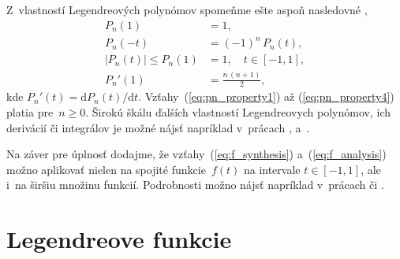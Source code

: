 \documentclass[a4paper,12pt]{book}
\newcommand{\diff}{\mathrm d}
\begin{document}
Z~vlastností Legendreových polynómov spomeňme ešte aspoň nasledovné
\parencite{Freeden2009},
%
\begin{align}
\label{eq:pn_property1}
P_n(1) &= 1{,}\\
%
\label{eq:pn_property2}
P_n(-t) &= (-1)^n \, P_n(t){,}\\
%
\label{eq:pn_property3}
|P_n(t)| \leq P_n(1) &= 1{,} \quad t \in [-1, 1]{,}\\
%
\label{eq:pn_property4}
P_n'(1) &= \frac{n \, (n + 1)}{2}{,}
\end{align}
%
kde $P_n'(t) = \diff P_n(t) \slash \diff t$.  Vzťahy~(\ref{eq:pn_property1}) až
(\ref{eq:pn_property4}) platia pre~$n \geq 0$.   Širokú škálu ďalších
vlastností Legendreovych polynómov, ich derivácií či integrálov je možné nájsť
napríklad v~prácach \textcite{Gradshteyn2007}, \textcite{Freeden2009}
a~\textcite{Olver2010}.

Na záver pre úplnosť dodajme, že vzťahy~(\ref{eq:f_synthesis})
a~(\ref{eq:f_analysis}) možno aplikovať nielen na spojité funkcie~$f(t)$ na
intervale $t \in [-1, 1]$, ale i~na širšiu množinu funkcií.  Podrobnosti možno
nájsť napríklad v~prácach \textcite{Freeden2009} či \textcite{Arfken2005}.






\section{Legendreove funkcie}
\label{sec:legendre_functions}
\end{document}
